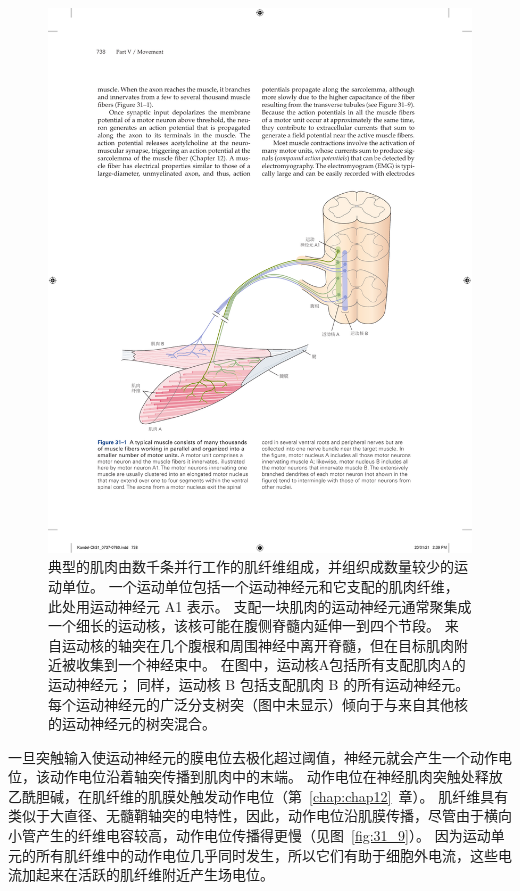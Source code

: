 \begin{figure}[htbp]
	\centering
	\includegraphics[width=1.0\linewidth]{chap31/fig_31_1}
	\caption{典型的肌肉由数千条并行工作的肌纤维组成，并组织成数量较少的运动单位。
		一个运动单位包括一个运动神经元和它支配的肌肉纤维，此处用运动神经元 A1 表示。
		支配一块肌肉的运动神经元通常聚集成一个细长的运动核，该核可能在腹侧脊髓内延伸一到四个节段。
		来自运动核的轴突在几个腹根和周围神经中离开脊髓，但在目标肌肉附近被收集到一个神经束中。
		在图中，运动核A包括所有支配肌肉A的运动神经元；
		同样，运动核 B 包括支配肌肉 B 的所有运动神经元。
		每个运动神经元的广泛分支树突（图中未显示）倾向于与来自其他核的运动神经元的树突混合。}
	\label{fig:31_1}
\end{figure}


一旦突触输入使运动神经元的膜电位去极化超过阈值，神经元就会产生一个动作电位，该动作电位沿着轴突传播到肌肉中的末端。
动作电位在神经肌肉突触处释放乙酰胆碱，在肌纤维的肌膜处触发动作电位（第~\ref{chap:chap12}~章）。
肌纤维具有类似于大直径、无髓鞘轴突的电特性，因此，动作电位沿肌膜传播，尽管由于横向小管产生的纤维电容较高，动作电位传播得更慢（见图~\ref{fig:31_9}）。
因为运动单元的所有肌纤维中的动作电位几乎同时发生，所以它们有助于细胞外电流，这些电流加起来在活跃的肌纤维附近产生场电位。


